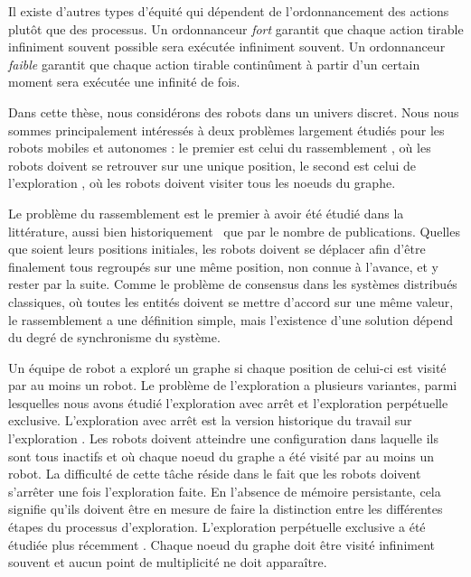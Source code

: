 Il existe d'autres types d'équité qui dépendent de l'ordonnancement
des actions plutôt que des processus.  Un ordonnanceur \emph{fort}
garantit que chaque action tirable infiniment souvent possible sera
exécutée infiniment souvent. Un ordonnanceur \emph{faible} garantit
que chaque action tirable continûment à partir d'un certain moment
sera exécutée une infinité de fois.
 

\bigskip Dans cette thèse, nous considérons des robots dans un univers
discret.  Nous nous sommes principalement intéressés à deux problèmes
largement étudiés pour les robots mobiles et autonomes : le premier
est celui du rassemblement \cite{markoubook}, où les robots doivent se
retrouver sur une unique position, le second est celui de
l'exploration \cite{flocchini_computing_2007,
  devismes_optimal_2010-1}, où les robots doivent visiter tous les
noeuds du graphe.

Le problème du rassemblement est le premier à avoir été étudié dans la
littérature, aussi bien
historiquement~\cite{suzuki_distributed_1999,KlasingMP06,
  klasing_taking_2008,Pelc11} que par le nombre de publications.
Quelles que soient leurs positions initiales, les robots doivent se
déplacer afin d'être finalement tous regroupés sur une même position,
non connue à l'avance, et y rester par la suite.  Comme le problème de
consensus dans les systèmes distribués classiques, où toutes les
entités doivent se mettre d'accord sur une même valeur, le
rassemblement a une définition simple, mais l'existence d'une solution
dépend du degré de synchronisme du système.

Un équipe de robot a exploré un graphe si chaque position de celui-ci
est visité par au moins un robot.  Le problème de l'exploration a
plusieurs variantes, parmi lesquelles nous avons étudié l'exploration avec
arrêt et l'exploration perpétuelle exclusive.  L'exploration avec
arrêt est la version historique du travail sur l'exploration
\cite{flocchini_computing_2007,lamani_optimal_2010,devismes_optimal_2010-1}.
Les robots doivent atteindre une configuration dans laquelle ils sont
tous inactifs et où chaque noeud du graphe a été visité par au moins
un robot. La difficulté de cette tâche réside dans le fait que les
robots doivent s'arrêter une fois l'exploration faite. En l'absence de
mémoire persistante, cela signifie qu'ils doivent être en mesure de
faire la distinction entre les différentes étapes du processus
d'exploration.  L'exploration perpétuelle exclusive a été étudiée plus
récemment \cite{blin_exclusive_2010, navarraipdps2013}.  Chaque noeud
du graphe doit être visité infiniment souvent et aucun point de
multiplicité ne doit apparaître.
	
